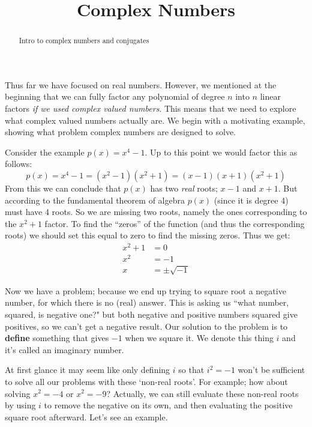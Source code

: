 \documentclass{ximera}
\title{Complex Numbers}
\begin{document}
\begin{abstract}
    Intro to complex numbers and conjugates
\end{abstract}
\maketitle

Thus far we have focused on real numbers. However, we mentioned at the beginning that we can fully factor any polynomial of degree $n$ into $n$ linear factors \textit{if we used complex valued numbers}. This means that we need to explore what complex valued numbers actually are. We begin with a motivating example, showing what problem complex numbers are designed to solve.

\begin{example}
    Consider the example $p(x) = x^4 - 1$. Up to this point we would factor this as follows:
    \[
        p(x) = x^4 - 1 = (x^2 - 1)(x^2 + 1) = (x - 1)(x + 1)(x^2 + 1)
    \]
    From this we can conclude that $p(x)$ has two \textit{real} roots; $x - 1$ and $x + 1$. But according to the fundamental theorem of algebra $p(x)$ (since it is degree 4) must have 4 roots. So we are missing two roots, namely the ones corresponding to the $x^2 + 1$ factor. To find the ``zeros'' of the function (and thus the corresponding roots) we should set this equal to zero to find the missing zeros. Thus we get:
    \begin{align*}
        x^2 +1 &= 0\\
        x^2 &= -1\\
        x &= \pm \sqrt{-1}
    \end{align*}
    
    Now we have a problem; because we end up trying to square root a negative number, for which there is no (real) answer. This is asking us ``what number, squared, is negative one?" but both negative and positive numbers squared give positives, so we can't get a negative result.
    Our solution to the problem is to \textbf{define} something that gives $-1$ when we square it. We denote this thing $i$ and it's called an imaginary number.
\end{example}
    
    
    
    At first glance it may seem like only defining $i$ so that $i^2 = -1$ won't be sufficient to solve all our problems with these `non-real roots'. For example; how about solving $x^2 = -4$ or $x^2 = -9$? Actually, we can still evaluate these non-real roots by using $i$ to remove the negative on its own, and then evaluating the positive square root afterward. Let's see an example.
    
\end{document}
